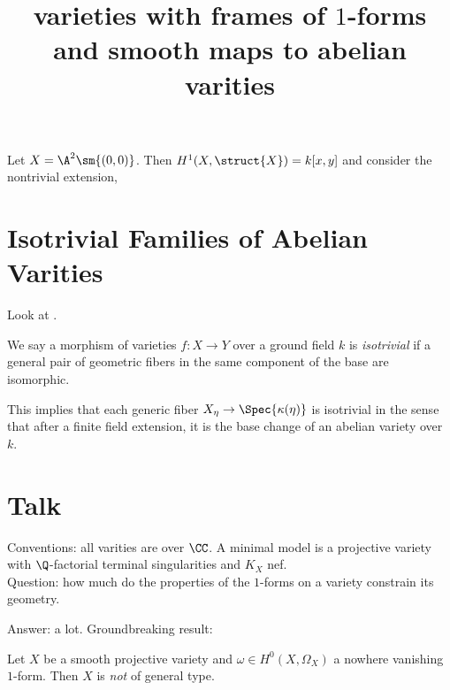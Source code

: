 \documentclass[12pt]{article}
\begin{document}
\begin{example}
Let $X = \A^2 \sm \{ (0,0) \}$. Then $H^1(X, \struct{X}) = k[x,y]$ and consider the nontrivial extension,
\begin{center}
\begin{tikzcd}

\end{tikzcd}
\end{center}
\end{example}

\section{Isotrivial Families of Abelian Varities}

Look at .

\begin{definition}
We say a morphism of varieties $f : X \to Y$ over a ground field $k$ is \textit{isotrivial} if a general pair of geometric fibers in the same component of the base are isomorphic.
\end{definition}

\begin{remark}
This implies that each generic fiber $X_{\eta} \to \Spec{\kappa(\eta)}$ is isotrivial in the sense that after a finite field extension, it is the base change of an abelian variety over $k$.
\end{remark}

\section{Talk}

\title{varieties with frames of $1$-forms and smooth maps to abelian varities}

Conventions: all varities are over $\CC$. A minimal model is a projective variety with $\Q$-factorial terminal singularities and $K_X$ nef. 
\\ 

Question: how much do the properties of the $1$-forms on a variety constrain its geometry.

Answer: a lot. Groundbreaking result:

\begin{theorem}
Let $X$ be a smooth projective variety and $\omega \in H^0(X, \Omega_X)$ a nowhere vanishing $1$-form. Then $X$ is \textit{not} of general type. 
\end{theorem}
\end{document}
